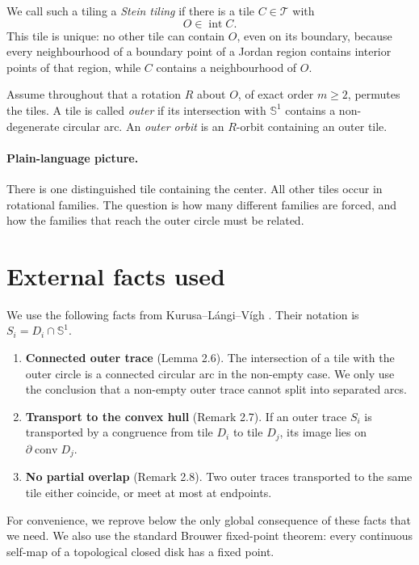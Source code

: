 \documentclass[10.5pt]{article}
\theoremstyle{remark}
\newcommand{\Sph}{\mathbb S}
\newcommand{\conv}{\operatorname{conv}}
\newcommand{\interior}{\operatorname{int}}
\begin{document}
We call such a tiling a \emph{Stein tiling} if there is a tile $C\in\mathcal T$ with
\[
 O\in\interior C.
\]
This tile is unique: no other tile can contain $O$, even on its boundary, because every neighbourhood of a boundary point of a Jordan region contains interior points of that region, while $C$ contains a neighbourhood of $O$.

Assume throughout that a rotation $R$ about $O$, of exact order $m\ge2$, permutes the tiles. A tile is called \emph{outer} if its intersection with $\Sph^1$ contains a non-degenerate circular arc. An \emph{outer orbit} is an $R$-orbit containing an outer tile.

\paragraph{Plain-language picture.}
There is one distinguished tile containing the center. All other tiles occur in rotational families. The question is how many different families are forced, and how the families that reach the outer circle must be related.

\section{External facts used}

We use the following facts from Kurusa--L\'angi--V\'igh \cite{KLV2020}. Their notation is $S_i=D_i\cap\Sph^1$.

\begin{enumerate}[label=(K\arabic*)]
\item \textbf{Connected outer trace} (Lemma 2.6). The intersection of a tile with the outer circle is a connected circular arc in the non-empty case. We only use the conclusion that a non-empty outer trace cannot split into separated arcs.

\item \textbf{Transport to the convex hull} (Remark 2.7). If an outer trace $S_i$ is transported by a congruence from tile $D_i$ to tile $D_j$, its image lies on $\partial\conv D_j$.

\item \textbf{No partial overlap} (Remark 2.8). Two outer traces transported to the same tile either coincide, or meet at most at endpoints.
\end{enumerate}

For convenience, we reprove below the only global consequence of these facts that we need. We also use the standard Brouwer fixed-point theorem: every continuous self-map of a topological closed disk has a fixed point.
\end{document}
